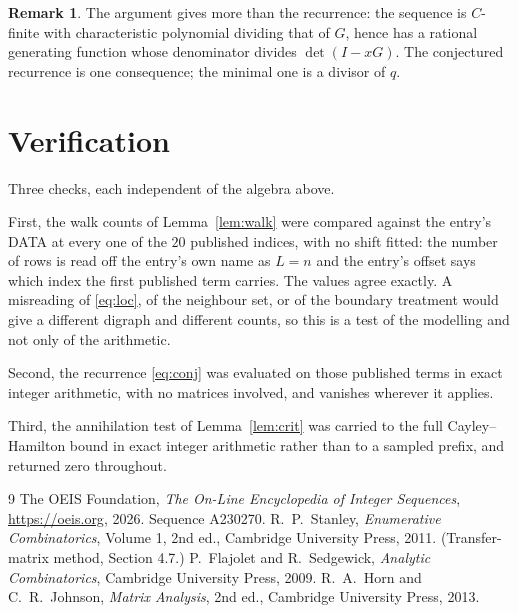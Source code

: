 \documentclass[11pt,a4paper]{article}
\theoremstyle{plain}
\theoremstyle{definition}
\newtheorem{remark}[theorem]{Remark}
\begin{document}
\begin{remark}
The argument gives more than the recurrence: the sequence is $C$-finite with characteristic
polynomial dividing that of $G$, hence has a rational generating function whose denominator
divides $\det(I-xG)$. The conjectured recurrence is one consequence; the minimal one is a
divisor of $q$.
\end{remark}

\section{Verification}

Three checks, each independent of the algebra above.

First, the walk counts of Lemma~\ref{lem:walk} were compared against the entry's DATA at
every one of the $20$ published indices, with no shift fitted: the number of rows is
read off the entry's own name as $L=n$ and the entry's offset says which index the first
published term carries. The values agree exactly. A misreading of \eqref{eq:loc}, of the
neighbour set, or of the boundary treatment would give a different digraph and different
counts, so this is a test of the modelling and not only of the arithmetic.

Second, the recurrence \eqref{eq:conj} was evaluated on those published terms in exact
integer arithmetic, with no matrices involved, and vanishes wherever it applies.

Third, the annihilation test of Lemma~\ref{lem:crit} was carried to the full
Cayley--Hamilton bound in exact integer arithmetic rather than to a sampled prefix, and
returned zero throughout.

\begin{thebibliography}{9}
 The OEIS Foundation, \emph{The On-Line Encyclopedia of Integer
Sequences}, \url{https://oeis.org}, 2026. Sequence A230270.
 R.~P.~Stanley, \emph{Enumerative Combinatorics}, Volume 1, 2nd ed.,
Cambridge University Press, 2011. (Transfer-matrix method, Section 4.7.)
 P.~Flajolet and R.~Sedgewick, \emph{Analytic Combinatorics}, Cambridge
University Press, 2009.
 R.~A.~Horn and C.~R.~Johnson, \emph{Matrix Analysis}, 2nd ed., Cambridge
University Press, 2013.
\end{thebibliography}
\end{document}
